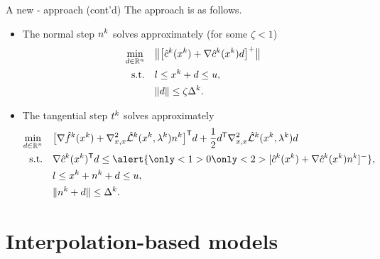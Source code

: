 \documentclass[
]{presentation}
\newcommand{\objm}[1][]{\hat{f}\ifblank{#1}{}{^{#1}}}
\newcommand{\conm}[1][]{\hat{c}\ifblank{#1}{}{^{#1}}}
\newcommand{\iter}[1][]{x\ifblank{#1}{}{^{#1}}}
\newcommand{\lagm}[1][]{\hat{\mathcal{L}}\ifblank{#1}{}{^{#1}}}
\newcommand{\lm}[1][]{\lambda\ifblank{#1}{}{^{#1}}}
\newcommand{\nstep}[1][]{n\ifblank{#1}{}{^{#1}}}
\newcommand{\rad}[1][]{\Delta\ifblank{#1}{}{^{#1}}}
\newcommand{\step}[1][]{d\ifblank{#1}{}{^{#1}}}
\newcommand{\tstep}[1][]{t\ifblank{#1}{}{^{#1}}}
\newcommand{\xl}{l}
\newcommand{\xu}{u}
\begin{document}
\begin{frame}{A new \citeauthor{Byrd_1987}-\citeauthor{Omojokun_1989} approach (cont'd)}
    The \alert{} approach is as follows.
    \begin{itemize}
        \item The normal step $\nstep[k]$ solves approximately (for some $\zeta < 1$)
        \begin{align*}
            \min_{\step \in \R^n}   & \quad \norm[\big]{\big[ \conm[k](\iter[k]) + \nabla \conm[k](\iter[k]) \step \big]^+}\\
            \textrm{s.t.}           & \quad \xl \le \iter[k] + \step \le \xu,\\
                                    & \quad \norm{\step} \le \zeta \rad[k].
        \end{align*}
        \item The tangential step $\tstep[k]$ solves approximately
        \begin{align*}
            \min_{\step \in \R^n}   & \quad \big[ \nabla \objm[k](\iter[k]) + \nabla_{x, x}^2 \lagm[k](\iter[k], \lm[k]) \nstep[k] \big]^{\T} \step + \frac{1}{2} \step^{\T} \nabla_{x, x}^2 \lagm[k](\iter[k], \lm[k]) \step\\
            \textrm{s.t.}           & \quad \nabla \conm[k](\iter[k])^{\T} \step \le \alert{\only<1>{0}\only<2>{[\conm[k](\iter[k]) + \nabla \conm[k](\iter[k]) \nstep[k]]^-}},\\
                                    & \quad \xl \le \iter[k] + \nstep[k] + \step \le \xu,\\
                                    & \quad \norm{\nstep[k] + \step} \le \rad[k].
        \end{align*}
    \end{itemize}
\end{frame}

\section{Interpolation-based models}
\end{document}
